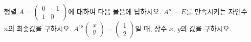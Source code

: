 행렬 $A=\begin{pmatrix} 0 & -1 \\ 1 & 0 \end{pmatrix}$에 대하여 다음 물음에 답하시오.
 $A^n=E$를 만족시키는 자연수 $n$의 최솟값을 구하시오. 
 $A^{18}\begin{pmatrix} x \\ y \end{pmatrix}=\begin{pmatrix} 1 \\ 2 \end{pmatrix}$일 때, 상수 $x$, $y$의 값을 구하시오.
